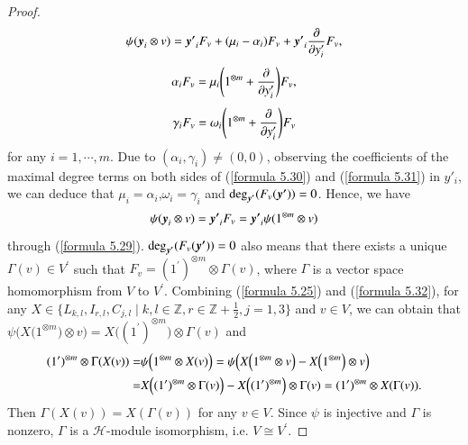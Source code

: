 \documentclass[12pt,reqno]{amsart}
\numberwithin{equation}{section}
\begin{document}
\begin{proof}
\begin{equation}\label{formula 5.29}
\aligned
\psi(\boldsymbol{y}_i\otimes v)=\boldsymbol{y^\prime}_iF_v+(\mu_i-\alpha_i)F_v+\boldsymbol{y^\prime}_i\frac{\partial}{\partial{y'_i}}F_v,
\endaligned 
\end{equation}
\begin{equation}\label{formula 5.30}
\aligned
\alpha_iF_v=\mu_i\Bigg(1^{\otimes m}+\frac{\partial}{\partial{y'_i}}\Bigg)F_v,
\endaligned 
\end{equation}
\begin{equation}\label{formula 5.31}
\aligned
\gamma_iF_v=\omega_i\Bigg(1^{\otimes m}+\frac{\partial}{\partial{y'_i}}\Bigg)F_v
\endaligned 
\end{equation}
for any $i=1,\cdots,m$.
 Due to $(\alpha_i,\gamma_i)\neq(0,0)$, observing  the coefficients of the maximal degree terms on both sides of (\ref{formula 5.30}) and (\ref{formula 5.31}) in $y'_i$, we can deduce that $\mu_i=\alpha_i$,$\omega_i=\gamma_i$ and 
 ${\rm deg}_{\boldsymbol{y^\prime}}(F_v(\boldsymbol{y^\prime}))=0$.
Hence, 
 we have  
\begin{equation}\label{formula 5.32}
\aligned
\psi(\boldsymbol{y}_i\otimes v)=\boldsymbol{y^\prime}_iF_v=\boldsymbol{y^\prime}_i\psi(1^{\otimes m}\otimes v)
\endaligned 
\end{equation}
through (\ref{formula 5.29}). ${\rm deg}_{\boldsymbol{y^\prime}}(F_v(\boldsymbol{y^\prime}))=0$ also means that
 there exists a unique $\Gamma(v)\in V^\prime$ such that
  $F_v=(1^\prime)^{\otimes m}\otimes \Gamma(v)$, where $\Gamma$ is a vector space homomorphism from $V$ to $V^\prime$. Combining (\ref{formula 5.25}) and (\ref{formula 5.32}), for  any $X\in\{L_{k,l}, I_{r,l}, C_{j,l} \mid k,l\in \mathbb{Z}, r\in\mathbb{Z}+\tfrac{1}{2}, j=1,3  \}$ and $v\in V$, we can obtain that $\psi\Big(X\Big(1^{\otimes m}\Big)\otimes v  \Big)=X\Big( (1^\prime)^{\otimes m} \Big)\otimes \Gamma(v)$
and
\begin{equation*}\label{formula 5.4.2.3}
\aligned
(1^\prime)^{\otimes m}\otimes \Gamma(X(v))=&\psi\Big( 1^{\otimes m}\otimes  X(v) \Big)
=\psi\Big(X\Big( 1^{\otimes m}\otimes  v \Big)-  X\Big(1^{\otimes m} \Big) \otimes v\Big)\\
=&X\Big( (1^\prime)^{\otimes m}\otimes  \Gamma(v) \Big)-  X\Big((1^\prime)^{\otimes m} \Big) \otimes \Gamma(v)
=(1^\prime)^{\otimes m}\otimes X(\Gamma(v)).
\endaligned 
\end{equation*}
Then $\Gamma(X(v))=X(\Gamma(v))$ for any $v\in V$. Since $\psi$ is injective and $\Gamma$ is nonzero,  $\Gamma$ is a $\mathcal{H}$-module  isomorphism, i.e.  $V\cong V^\prime$.

\end{proof}
\end{document}
